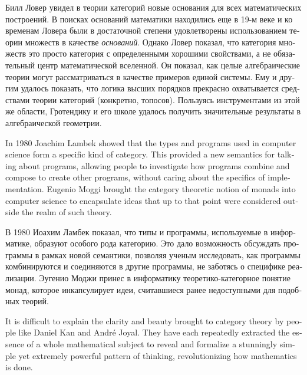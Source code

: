 \documentclass{book}
\theoremstyle{theoremENG}
\theoremstyle{lemmaENG}
\theoremstyle{propositionENG}
\theoremstyle{corollaryENG}
\theoremstyle{factENG}
\theoremstyle{remarkENG}
\theoremstyle{exampleENG}
\theoremstyle{warningENG}
\theoremstyle{questionENG}
\theoremstyle{guessENG}
\theoremstyle{answerENG}
\theoremstyle{constructionENG}
\theoremstyle{rulesENG}
\theoremstyle{excENG}
\theoremstyle{appENG}
\theoremstyle{definitionENG}
\theoremstyle{notationENG}
\theoremstyle{conjectureENG}
\theoremstyle{postulateENG}
\theoremstyle{theoremRUS}
\theoremstyle{lemmaRUS}
\theoremstyle{propositionRUS}
\theoremstyle{corollaryRUS}
\theoremstyle{factRUS}
\theoremstyle{remarkRUS}
\theoremstyle{exampleRUS}
\theoremstyle{warningRUS}
\theoremstyle{questionRUS}
\theoremstyle{guessRUS}
\theoremstyle{answerRUS}
\theoremstyle{constructionRUS}
\theoremstyle{rulesRUS}
\theoremstyle{excRUS}
\theoremstyle{appRUS}
\theoremstyle{definitionRUS}
\theoremstyle{notationRUS}
\theoremstyle{conjectureRUS}
\theoremstyle{postulateRUS}
\begin{document}
\begin{english}
\begin{russian}Билл Ловер увидел в теории категорий новые основания для всех математических построений. В поисках оснований математики находились еще в 19-м веке и ко временам Ловера были в достаточной степени удовлетворены использованием теории множеств в качестве {\em оснований}. Однако Ловер показал, что категория множеств это просто категория с определенными хорошими свойствами, а не обязательный центр математической вселенной. Он показал, как целые алгебраические теории могут рассматриваться в качестве примеров единой системы. Ему и другим удалось показать, что логика высших порядков прекрасно охватывается средствами теории категорий (конкретно, топосов). Пользуясь инструментами из этой же области, Гротендику и его школе удалось получить значительные результаты в алгебраической геометрии. \end{russian}

In 1980 Joachim Lambek showed that the types and programs used in computer science form a specific kind of category. This provided a new semantics for talking about programs, allowing people to investigate how programs combine and compose to create other programs, without caring about the specifics of implementation. Eugenio Moggi brought the category theoretic notion of monads into computer science to encapsulate ideas that up to that point were considered outside the realm of such theory.

\begin{russian}В 1980 Иоахим Ламбек показал, что типы и программы, используемые в информатике, образуют особого рода категорию. Это дало возможность обсуждать программы в рамках новой семантики, позволяя ученым исследовать, как программы комбинируются и соединяются в другие программы, не заботясь о специфике реализации. Эугенио Моджи принес в информатику теоретико-категорное понятие монад, которое инкапсулирует идеи, считавшиеся ранее недоступными для подобных теорий. \end{russian}

It is difficult to explain the clarity and beauty brought to category theory by people like Daniel Kan and Andr\'{e} Joyal. They have each repeatedly extracted the essence of a whole mathematical subject to reveal and formalize a stunningly simple yet extremely powerful pattern of thinking, revolutionizing how mathematics is done.


\end{english}
\end{document}
